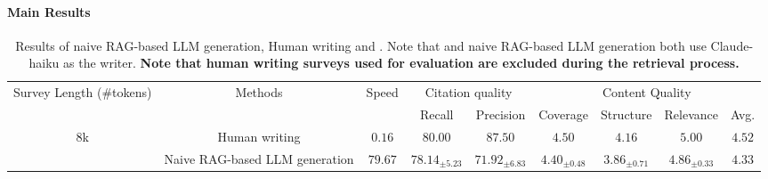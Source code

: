 \paragraph{Main Results}

\begin{table}[ht!]
\centering
\caption{Results of naive RAG-based LLM generation, Human writing and \ourmethod. Note that \ourmethod and naive RAG-based LLM generation both use Claude-haiku as the writer. \textbf{Note that human writing surveys used for evaluation are excluded during the retrieval process.}}
\label{table:main-result}
\begin{adjustbox}{width=0.9\textwidth}
\begin{tabular}{cc|c|cc|cccc}
\toprule

\multirow{2}{*}{Survey Length (\#tokens)}  & \multirow{2}{*}{Methods} & \multirow{2}{*}{Speed} & \multicolumn{2}{c|}{Citation quality} & \multicolumn{4}{c}{Content Quality} \\ 
 & & & Recall & Precision & Coverage & Structure & Relevance & Avg. \\ \midrule
\multirow{3}{*}{8k}    
                       & Human writing     & $0.16$  &  $80.00$ & $87.50$     &  $4.50$   &  $4.16$      &  $5.00$           & $4.52$     \\
                       
                       & Naive RAG-based LLM generation & $79.67$ & $78.14_{\pm 5.23}$ & $71.92_{\pm 6.83}$  & $4.40_{\pm 0.48}$     & $3.86_{\pm 0.71}$      & $4.86_{\pm 0.33}$              & $4.33$\\
                       

\end{tabular}
\end{adjustbox}
\end{table}
